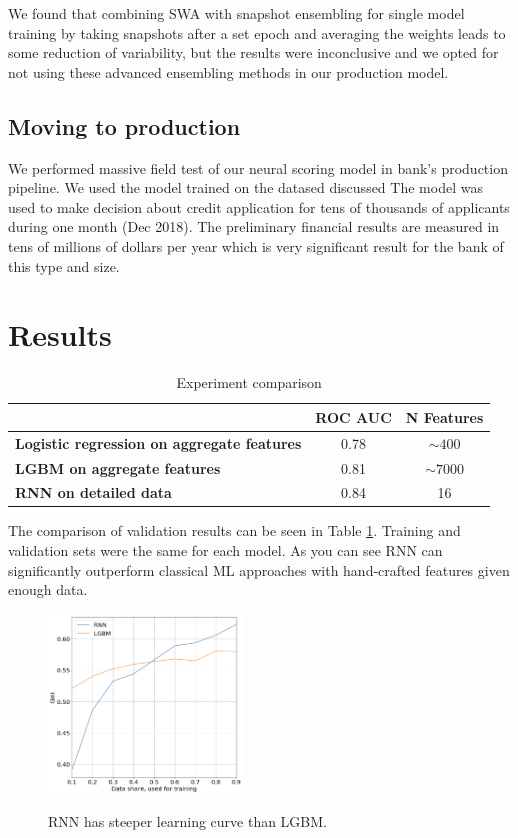 \documentclass{sigkddExp}
\begin{document}
We found that combining SWA with snapshot ensembling for single model training by taking snapshots after a set epoch and averaging the weights leads to some reduction of variability, but the results were inconclusive and we opted for not using these advanced ensembling methods in our production model.


\subsection{Moving to production}

We performed massive field test of our neural scoring model in bank's production pipeline. We used the model trained on the datased discussed
The model was used to make decision about credit application for tens of thousands of applicants during one month (Dec 2018).
The preliminary financial results are measured in tens of millions of dollars per year which is very significant result for the bank of this type and size.

\section{Results}
\begin{table}
\caption{Experiment comparison}
\begin{tabular}{ | p{12em} | c | c | }
\hline
& \textbf{ROC AUC} & \textbf{N Features} \\
\hline
\textbf{Logistic regression on aggregate features} & 0.78 & $\sim400$ \\
\textbf{LGBM on aggregate features} & 0.81 & $\sim7000$ \\
\textbf{RNN on detailed data} & 0.84 & 16 \\
\hline
\end{tabular}
\label{tab2}
\end{table}

The comparison of validation results can be seen in Table \ref{tab2}. Training and validation sets were the same for each model.  As you can see RNN can significantly outperform classical ML approaches with hand-crafted features given enough data.

\begin{figure}
  \caption{RNN has steeper learning curve than LGBM.}
  \includegraphics[width=0.46\textwidth]{learning-curve.png}
  \label{fig-lc}
\end{figure}
\end{document}
